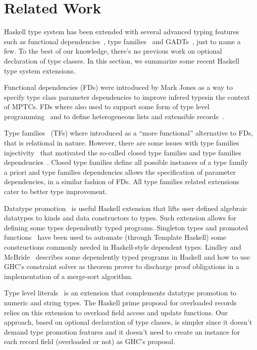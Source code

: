 \section{Related Work}
\label{sec:related-work}

Haskell type system has been extended with several advanced typing features
such as functional dependencies~\cite{Jones2008}, type families~\cite{Chakravarty2005} and
GADTs~\cite{Chen2016}, just to name a few. To the best of our knowledge, there's no
previous work on optional declaration of type classes. In this section, we
summarize some recent Haskell type system extensions.

Functional dependencies (FDs) were introduced by Mark Jones as a way to specify
type class parameter dependencies to improve infered typesin the
context of MPTCs. FDs where also used to support some form of type level
programming~\cite{Hallgren2000} and to define heterogeneous lists and
extensible records~\cite{KiselyovLS04}.

Type families~\cite{Chakravarty2005} (TFs) where introduced as a ``more functional'' alternative
to FDs, that is relational in nature. However, there are some issues with
type families injectivity~\cite{Eisenberg2014} that motivated the so-called closed type
families and type families dependencies~\cite{Eisenberg2014a}. Closed type families define all
possible instances of a type family a priori and type families dependencies allows
the specification of parameter dependencies, in a similar fashion of FDs.
All type families related extensions cater to better type improvement.

Datatype promotion~\cite{Yorgey2012,Eisenberg2014} is useful Haskell extension that lifts user
defined algebraic datatypes to kinds and data constructors to types. Such
extension allows for defining some types dependently typed programs.
Singleton types and promoted functions~\cite{Eisenberg2012} have been used to automate
(through Template Haskell) some constructions commonly needed in Haskell-style
dependent types. Lindley and McBride~\cite{Lindley2013} describes some dependently
typed programs in Haskell and how to use GHC's constraint solver as theorem
prover to discharge proof obligations in a implementation of a merge-sort
algorithm.

Type level literals~\cite{type-lits} is an extension that complements datatype
promotion to numeric and string types. The Haskell prime proposal for
overloaded records relies on this extension to overload field
access and update functions. Our approach, based on optional declaration of
type classes, is simpler since it doesn't demand type promotion features and
it doesn't need to create an instance for each record field (overloaded or not)
as GHC's proposal.
